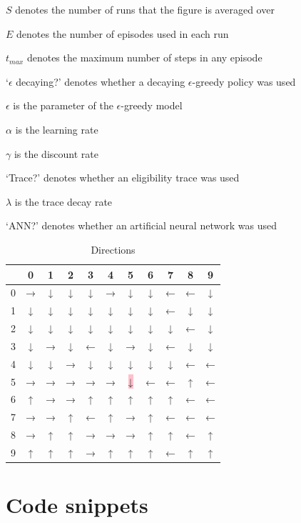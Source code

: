 \documentclass[a4paper, 11pt, twocolumn, final]{article} %
\begin{document}
\begin{itemize*}
  \item $S$ denotes the number of runs that the figure is averaged over
  \item $E$ denotes the number of episodes used in each run
  \item $t_{max}$ denotes the maximum number of steps in any episode
  \item `$\epsilon$ decaying?' denotes whether a decaying $\epsilon$-greedy
    policy was used
  \item $\epsilon$ is the parameter of the $\epsilon$-greedy model
  \item $\alpha$ is the learning rate
  \item $\gamma$ is the discount rate
  \item `Trace?' denotes whether an eligibility trace was used
  \item $\lambda$ is the trace decay rate
  \item `ANN?' denotes whether an artificial neural network was used
\end{itemize*}

\begin{table}[H]
  \centering
  \begin{tabular}{r | c c c c c c c c c c}
    \hline
      & 0 & 1 & 2 & 3 & 4 & 5 & 6 & 7 & 8 & 9 \\
    \hline
    0 & → & ↓ & ↓ & ↓ & → & ↓ & ↓ & ← & ← & ↓ \\
    1 & ↓ & ↓ & ↓ & ↓ & ↓ & ↓ & ↓ & ← & ↓ & ↓ \\
    2 & ↓ & ↓ & ↓ & ↓ & ↓ & ↓ & ↓ & ↓ & ← & ↓ \\
    3 & ↓ & → & ↓ & ← & ↓ & → & ↓ & ← & ↓ & ↓ \\
    4 & ↓ & ↓ & → & ↓ & ↓ & ↓ & ↓ & ↓ & ← & ← \\
    5 & → & → & → & → & → & \colorbox{pink}{↓} & ← & ← & ↑ & ← \\
    6 & ↑ & → & → & ↑ & ↑ & ↑ & ↑ & ↑ & ← & ← \\
    7 & → & → & ↑ & ← & ↑ & → & ↑ & ← & ← & ← \\
    8 & → & ↑ & ↑ & → & → & → & ↑ & ↑ & ← & ↑ \\
    9 & ↑ & ↑ & ↑ & → & ↑ & ↑ & ↑ & ← & ↑ & ↑ \\
    \hline
  \end{tabular}
  \caption{Directions}
  \label{tab:computed_directions}
\end{table}

\section{Code snippets} \label{sec:code}
\end{document}
